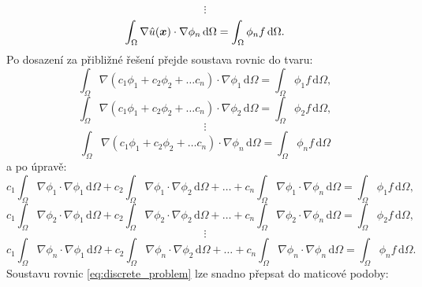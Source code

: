 \documentclass[12pt,a4paper,oneside]{article}
\numberwithin{equation}{section} %
\numberwithin{figure}{section} %
\numberwithin{table}{section} %
\newcommand{\dif}{\,\mathrm{d}} %
\renewcommand{\vec}[1]{\mbox{\boldmath$#1$}} %
\begin{document}
\begin{displaymath}
\vdots
\end{displaymath}
\begin{displaymath}
\int_\Omega \nabla \hat{u}(\vec{x}) \cdot \nabla \phi_n \dif \Omega = \int_\Omega \phi_n f \dif \Omega.
\end{displaymath}
Po dosazení za přibližné řešení přejde soustava rovnic do tvaru:
\begin{equation}
\int_\Omega \nabla (c_1 \phi_1 + c_2 \phi_2 +  \dots c_n ) \cdot \nabla \phi_1 \dif \Omega = \int_\Omega \phi_1 f \dif \Omega,
\end{equation}
\begin{displaymath}
\int_\Omega \nabla (c_1 \phi_1 + c_2 \phi_2 +  \dots c_n ) \cdot \nabla \phi_2 \dif \Omega = \int_\Omega \phi_2 f \dif \Omega,
\end{displaymath}
\begin{displaymath}
\vdots
\end{displaymath}
\begin{displaymath}
\int_\Omega \nabla (c_1 \phi_1 + c_2 \phi_2 +  \dots c_n ) \cdot \nabla \phi_n \dif \Omega = \int_\Omega \phi_n f \dif \Omega
\end{displaymath}
a po úpravě: 
\begin{displaymath}
 c_1 \int_\Omega \nabla \phi_1 \cdot \nabla \phi_1 \dif \Omega  +   
 c_2 \int_\Omega \nabla \phi_1 \cdot \nabla \phi_2 \dif \Omega   
 + \dots +
 c_n \int_\Omega \nabla \phi_1 \cdot \nabla \phi_n \dif \Omega   
 = \int_\Omega \phi_1 f \dif \Omega,
\end{displaymath}
\begin{displaymath}
 c_1 \int_\Omega \nabla \phi_2 \cdot \nabla \phi_1 \dif \Omega  +   
 c_2 \int_\Omega \nabla \phi_2 \cdot \nabla \phi_2 \dif \Omega   
 + \dots +
 c_n \int_\Omega \nabla \phi_2 \cdot \nabla \phi_n \dif \Omega   
 = \int_\Omega \phi_2 f \dif \Omega,
\end{displaymath}
\begin{displaymath}
\vdots
\end{displaymath}
\begin{equation}
 c_1 \int_\Omega \nabla \phi_n \cdot \nabla \phi_1 \dif \Omega  +   
 c_2 \int_\Omega \nabla \phi_n \cdot \nabla \phi_2 \dif \Omega   
 + \dots +
 c_n \int_\Omega \nabla \phi_n \cdot \nabla \phi_n \dif \Omega   
 = \int_\Omega \phi_n f \dif \Omega.
\label{eq:discrete_problem}
\end{equation}
Soustavu rovnic \ref{eq:discrete_problem} lze snadno přepsat do maticové podoby: 
\end{document}
